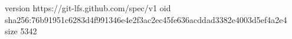 version https://git-lfs.github.com/spec/v1
oid sha256:76b91951c6283d4f991346e4e2f3ac2ec45fe636acddad3382e4003d5ef4a2e4
size 5342
